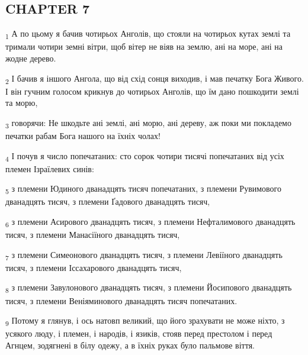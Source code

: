 \subsection{CHAPTER 7}
\begin{tcolorbox}
\textsubscript{1} А по цьому я бачив чотирьох Анголів, що стояли на чотирьох кутах землі та тримали чотири земні вітри, щоб вітер не віяв на землю, ані на море, ані на жодне дерево.
\end{tcolorbox}
\begin{tcolorbox}
\textsubscript{2} І бачив я іншого Ангола, що від схід сонця виходив, і мав печатку Бога Живого. І він гучним голосом крикнув до чотирьох Анголів, що їм дано пошкодити землі та морю,
\end{tcolorbox}
\begin{tcolorbox}
\textsubscript{3} говорячи: Не шкодьте ані землі, ані морю, ані дереву, аж поки ми покладемо печатки рабам Бога нашого на їхніх чолах!
\end{tcolorbox}
\begin{tcolorbox}
\textsubscript{4} І почув я число попечатаних: сто сорок чотири тисячі попечатаних від усіх племен Ізраїлевих синів:
\end{tcolorbox}
\begin{tcolorbox}
\textsubscript{5} з племени Юдиного дванадцять тисяч попечатаних, з племени Рувимового дванадцять тисяч, з племени Ґадового дванадцять тисяч,
\end{tcolorbox}
\begin{tcolorbox}
\textsubscript{6} з племени Асирового дванадцять тисяч, з племени Нефталимового дванадцять тисяч, з племени Манасіїного дванадцять тисяч,
\end{tcolorbox}
\begin{tcolorbox}
\textsubscript{7} з племени Симеонового дванадцять тисяч, з племени Левіїного дванадцять тисяч, з племени Іссахарового дванадцять тисяч,
\end{tcolorbox}
\begin{tcolorbox}
\textsubscript{8} з племени Завулонового дванадцять тисяч, з племени Йосипового дванадцять тисяч, з племени Веніяминового дванадцять тисяч попечатаних.
\end{tcolorbox}
\begin{tcolorbox}
\textsubscript{9} Потому я глянув, і ось натовп великий, що його зрахувати не може ніхто, з усякого люду, і племен, і народів, і язиків, стояв перед престолом і перед Агнцем, зодягнені в білу одежу, а в їхніх руках було пальмове віття.
\end{tcolorbox}
